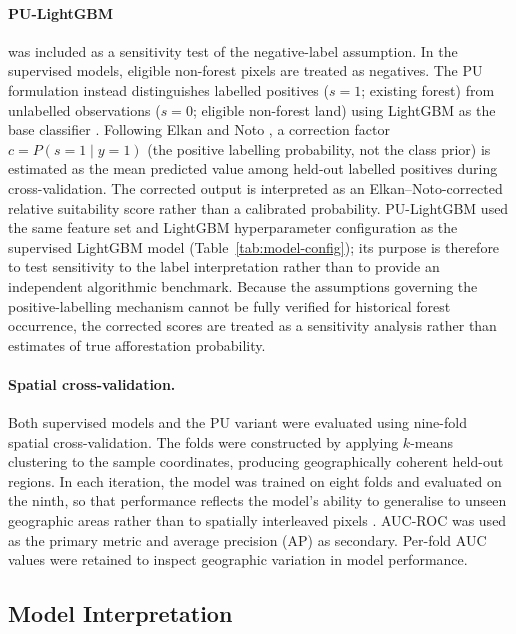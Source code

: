\documentclass[land,article,submit,moreauthors]{Definitions/mdpi}
\begin{document}
\paragraph{PU-LightGBM} was included as a sensitivity test of the negative-label assumption. In the supervised models, eligible non-forest pixels are treated as negatives. The PU formulation instead distinguishes labelled positives ($s=1$; existing forest) from unlabelled observations ($s=0$; eligible non-forest land) using LightGBM as the base classifier \citep{elkan2008,bekker2020}. Following Elkan and Noto \citep{elkan2008}, a correction factor $c = P(s{=}1 \mid y{=}1)$ (the positive labelling probability, not the class prior) is estimated as the mean predicted value among held-out labelled positives during cross-validation. The corrected output is interpreted as an Elkan--Noto-corrected relative suitability score rather than a calibrated probability. PU-LightGBM used the same feature set and LightGBM hyperparameter configuration as the supervised LightGBM model (Table~\ref{tab:model-config}); its purpose is therefore to test sensitivity to the label interpretation rather than to provide an independent algorithmic benchmark. Because the assumptions governing the positive-labelling mechanism cannot be fully verified for historical forest occurrence, the corrected scores are treated as a sensitivity analysis rather than estimates of true afforestation probability.

\paragraph{Spatial cross-validation.}
Both supervised models and the PU variant were evaluated using nine-fold spatial cross-validation. The folds were constructed by applying $k$-means clustering to the sample coordinates, producing geographically coherent held-out regions. In each iteration, the model was trained on eight folds and evaluated on the ninth, so that performance reflects the model's ability to generalise to unseen geographic areas rather than to spatially interleaved pixels \citep{meyer2022,roberts2017}. AUC-ROC was used as the primary metric and average precision (AP) as secondary. Per-fold AUC values were retained to inspect geographic variation in model performance.

\subsection{Model Interpretation}
\label{sec:shap}
\end{document}
